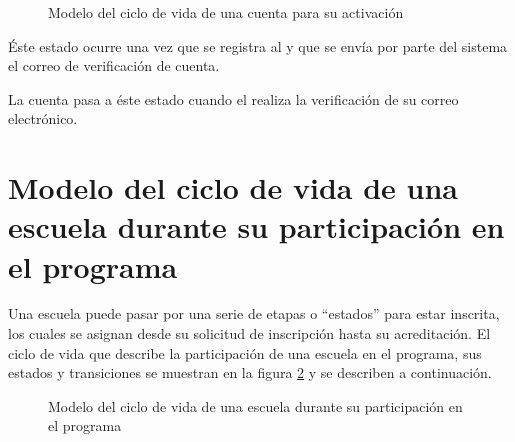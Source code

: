   \begin{figure}[htbp!]
  \centering
      \caption{Modelo del ciclo de vida de una cuenta para su activación}
      \label{fig:maquinaEstadosCuenta}
  \end{figure}

\begin{description}

      Éste estado ocurre una vez que se registra al  y que se envía por parte del sistema el correo de verificación de cuenta.

      La cuenta pasa a éste estado cuando el  realiza la verificación de su correo electrónico.
     
\end{description}

\section{Modelo del ciclo de vida de una escuela durante su participación en el programa} \label{subsec:escuela:maquina} \hypertarget{subsec:escuela:maquina}{}

Una escuela puede pasar por una serie de etapas o ``estados'' para estar inscrita, los cuales se asignan desde su solicitud de inscripción hasta su acreditación. El ciclo de vida que describe la participación de una escuela en el programa, sus estados y transiciones se muestran en la figura \ref{fig:maquinaEstadosEscuelas} y se describen a continuación.

  \begin{figure}[htbp!]
  \centering
      \caption{Modelo del ciclo de vida de una escuela durante su participación en el programa}
      \label{fig:maquinaEstadosEscuelas}
  \end{figure}

